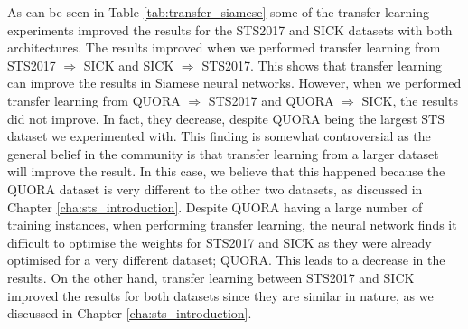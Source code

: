 \begin{table}[htb]
	\centering
	\caption[Results for transfer learning with Siamese Neural Network]{Results for transfer learning with different variants of Siamese Neural Network. For each transfer learning experiment we show the difference between with and without transfer learning. Non-grey values are the results of the experiments without transfer learning which we showed in the previous section. For ease of visualisation we only report the Pearson correlation ($\bm{\rho}$).}  
	\label{tab:transfer_siamese}
\end{table}

As can be seen in Table \ref{tab:transfer_siamese} some of the transfer learning experiments improved the results for the STS2017 and SICK datasets with both architectures. The results improved when we performed transfer learning from STS2017 $\Rightarrow$ SICK and SICK $\Rightarrow$ STS2017. This shows that transfer learning can improve the results in Siamese neural networks. However, when we performed transfer learning from QUORA $\Rightarrow$ STS2017 and QUORA $\Rightarrow$ SICK, the results did not improve. In fact, they decrease, despite QUORA being the largest STS dataset we experimented with. This finding is somewhat controversial as the general belief in the community is that transfer learning from a larger dataset will improve the result. In this case, we believe that this happened because the QUORA dataset is very different to the other two datasets, as discussed in Chapter \ref{cha:sts_introduction}. Despite QUORA having a large number of training instances, when performing transfer learning, the neural network finds it difficult to optimise the weights for STS2017 and SICK as they were already optimised for a very different dataset; QUORA. This leads to a decrease in the results. On the other hand, transfer learning between STS2017 and SICK improved the results for both datasets since they are similar in nature, as we discussed in Chapter \ref{cha:sts_introduction}. 

